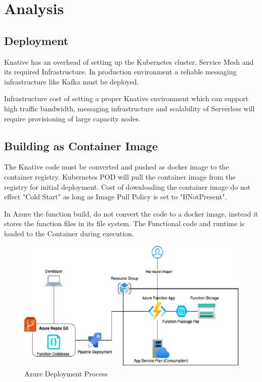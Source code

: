 \documentclass{article}
\begin{document}
\section{Analysis}

\subsection{Deployment}
Knative has an overhead of setting up the Kubernetes cluster, Service Mesh and its required Infrastructure. In production environment a reliable messaging infrastructure like Kafka must be deployed.
\par
Infrastructure cost of setting a proper Knative environment which can support high traffic bandwidth, messaging infrastructure and scalability of Serverless will require provisioning of large capacity nodes.
\par

\subsection{Building as Container Image}

The Knative code must be converted and pushed as docker image to the container registry. 
\hfill\break
Kubernetes \gls{POD} will pull the container image from the registry for initial deployment. Cost of downloading the container image do not effect "Cold Start" as long as Image Pull Policy is set to "\gls{IfNotPresent}". 
\par
In Azure the function build, do not convert the code to a docker image, instead it stores the function files in its file system. The Functional code and runtime is loaded to the Container during execution.
\begin{figure}[h]
   \centering
    \includegraphics[scale=1.0]{images/AzureDeploymentProcess.PNG}
    \caption{Azure Deployment Process}
    \label{fig:Deployment Process}
\end{figure}
\end{document}
